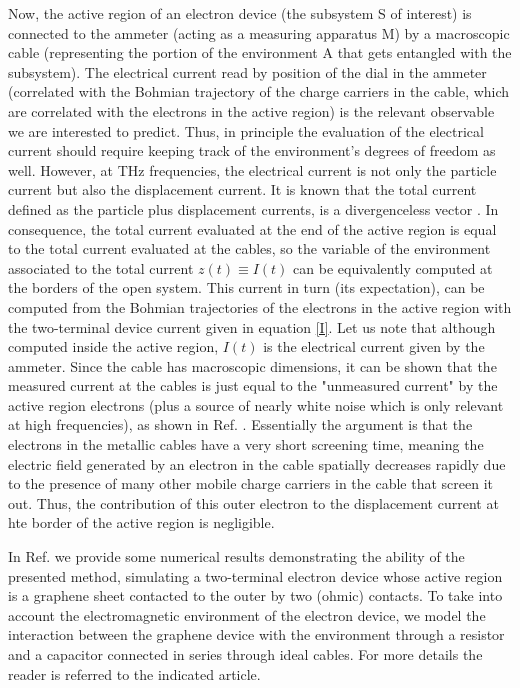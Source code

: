 \documentclass[11pt, a4paper]{article} %
\begin{document}
Now, the active region of an electron device (the subsystem S of interest) is connected to the ammeter (acting as a measuring apparatus M) by a macroscopic cable (representing the portion of the environment A that gets entangled with the subsystem). The electrical current read by position of the dial in the ammeter (correlated with the Bohmian trajectory of the charge carriers in the cable, which are correlated with the electrons in the active region) is the relevant observable we are interested to predict. Thus, in principle the evaluation of the electrical current should require keeping track of the environment's degrees of freedom as well. However, at THz frequencies, the electrical current is not only the particle current but also the displacement current. It is known that the total current defined as the particle plus displacement currents, is a divergenceless vector \cite{divergenceless}. In consequence, the total current evaluated at the end of the active region is equal to the total current evaluated at the cables, so the variable of the environment associated to the total current $z(t)\equiv I(t)$ can be equivalently computed at the borders of the open system. This current in turn (its expectation), can be computed from the Bohmian trajectories of the electrons in the active region with the two-terminal device current given in equation \eqref{I}. Let us note that although computed inside the active region, $I(t)$ is the electrical current given by the ammeter. Since the cable has macroscopic dimensions, it can be shown that the measured current at the cables is just equal to the "unmeasured current" by the active region electrons (plus a source of nearly white noise which is only relevant at high frequencies), as shown in Ref. \cite{equiv}. Essentially the argument is that the electrons in the metallic cables have a very short screening time, meaning the electric field generated by an electron in the cable spatially decreases rapidly due to the presence of many other mobile charge carriers in the cable that screen it out. Thus, the contribution of this outer electron to the displacement current at hte border of the active region is negligible.

In Ref. \cite{THz} we provide some numerical results demonstrating the ability of the presented method, simulating a two-terminal electron device whose active region is a graphene sheet contacted to the outer by two (ohmic) contacts. To take into account the electromagnetic environment of the electron device, we model the interaction between the graphene device with the environment through a resistor and a capacitor connected in series through ideal cables. For more details the reader is referred to the indicated article. 
\end{document}
